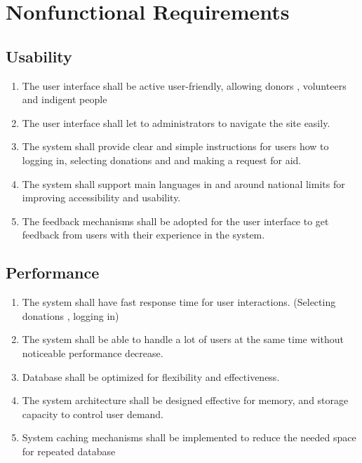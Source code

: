 \documentclass[a4paper,12pt]{report}
\begin{document}
	\chapter{Nonfunctional Requirements}
	\section{Usability}
        \begin{enumerate}
	        \item The user interface shall be active   user-friendly, allowing donors , volunteers and indigent people
	 	
	 		\item The user interface shall let to administrators to navigate the site easily.
	 	
	        \item The system shall provide clear and simple  instructions for users how to logging in, selecting donations and and making a request for aid. 
	 	
	 		\item The system shall support main languages in and around national limits for improving accessibility and usability.
	 	
	 		\item The feedback mechanisms shall be adopted for the user interface to get feedback from users with their experience in the system.
   		\end{enumerate}
	\section{Performance}
		\begin{enumerate}
			\item The system shall have fast response time  for user interactions. (Selecting donations , logging in)
	     
			\item The system shall be able to handle a lot of users at the same time without noticeable performance decrease.
	     
	        \item Database shall be optimized for flexibility and effectiveness.
	      
	        \item The system architecture shall be designed effective for  memory, and storage capacity to control user demand.
	     
	        \item System caching mechanisms shall be implemented to reduce the needed space for repeated database 
	 	\end{enumerate}
\end{document}
